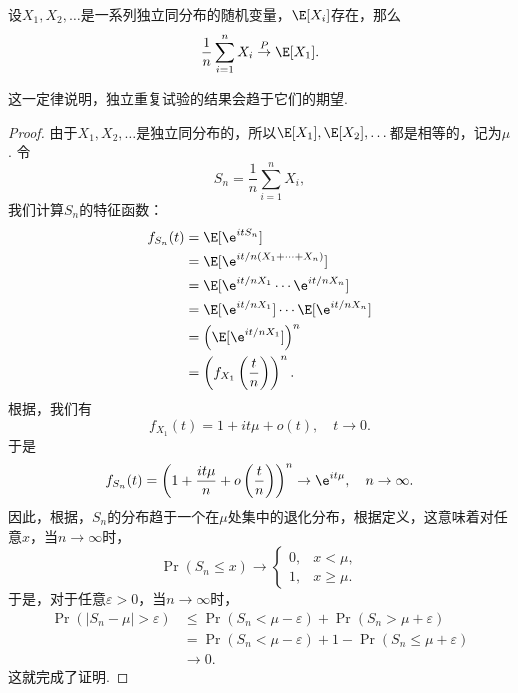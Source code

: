 \begin{theorem}[Khinchin大数定律]\label{thm:khinchin}
    设$X_1,X_2,\dots$是一系列独立同分布的随机变量，$\E[X_i]$存在，那么
    \[\frac{1}{n}\sum_{i=1}^n X_i\stackrel{P}{\to}\E[X_1].\]
\end{theorem}
这一定律说明，独立重复试验的结果会趋于它们的期望.
\begin{proof}
    由于$X_1,X_2,\dots$是独立同分布的，所以$\E[X_1],\E[X_2],\dots$都是相等的，记为$\mu$. 令
    \[S_n=\frac{1}{n}\sum_{i=1}^n X_i,\]
    我们计算$S_n$的特征函数：
    \begin{align*}
        f_{S_n}(t)&=\E[\e^{itS_n}]\\
        &=\E[\e^{it/n(X_1+\cdots+X_n)}]\\
        &=\E[\e^{it/nX_1}\cdots\e^{it/nX_n}]\\
        &=\E[\e^{it/nX_1}]\cdots\E[\e^{it/nX_n}]\\
        &=\left(\E[\e^{it/nX_1}]\right)^n\\
        &=\left(f_{X_1}\left(\frac{t}{n}\right)\right)^n.
    \end{align*}
    根据，我们有
    \[f_{X_1}(t)=1+it\mu+o(t),\quad t\to 0.\]
    于是
    \[f_{S_n}(t)=\left(1+\frac{it\mu}{n}+o\left(\frac{t}{n}\right)\right)^n\to\e^{it\mu},\quad n\to\infty.\]
    因此，根据，$S_n$的分布趋于一个在$\mu$处集中的退化分布，根据定义，这意味着对任意$x$，当$n\to\infty$时，
    \[\Pr(S_n\leq x)\to\begin{cases}
        0,&x<\mu,\\
        1,&x\geq\mu.
    \end{cases}\]
    于是，对于任意$\varepsilon>0$，当$n\to\infty$时，
    \begin{align*}
        \Pr(|S_n-\mu|>\varepsilon)&\leq \Pr(S_n<\mu-\varepsilon)+\Pr(S_n>\mu+\varepsilon)\\
        &=\Pr(S_n<\mu-\varepsilon)+1-\Pr(S_n\leq\mu+\varepsilon)\\
        &\to 0.
    \end{align*}
    这就完成了证明. 
\end{proof}
